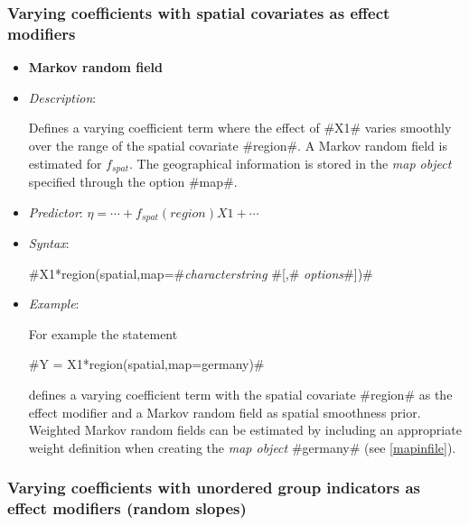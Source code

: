 \subsubsection*{ Varying coefficients with spatial covariates as
effect modifiers}

\begin{itemize}
\item[]{\bf\sffamily Markov random field}

\item[] {\em Description}:

Defines a varying coefficient term where the effect of #X1# varies
smoothly over the range of the spatial covariate #region#. A
Markov random field is estimated for $f_{spat}$. The geographical
information is stored in the {\em map object} specified through the
option #map#.
\item[] {\em Predictor}: $\eta = \cdots + f_{spat}(region)X1 + \cdots$
\item[] {\em Syntax}:

#X1*region(spatial,map=#{\it characterstring} #[,# {\it options}#])#
\item[] {\em Example}:

For example the statement

#Y = X1*region(spatial,map=germany)#

defines a varying coefficient term with the spatial covariate
#region# as the effect modifier and a Markov random field as spatial
smoothness prior. Weighted Markov random fields can be estimated by
including an appropriate weight definition when creating the {\em
map object} #germany# (see \autoref{mapinfile}).
\end{itemize}

\subsubsection*{Varying coefficients with unordered group indicators
as effect modifiers (random slopes)}


